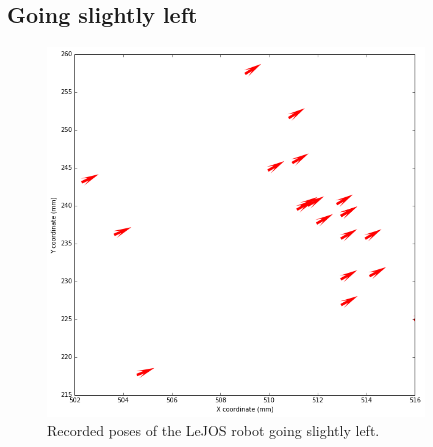 \documentclass[paper=a4, fontsize=11pt]{scrartcl} %
\begin{document}
    \subsection{Going slightly left}
    \begin{figure}[h]
        \begin{center}
            \setlength{\fboxsep}{0.5pt} %
            \setlength{\fboxrule}{0.5pt}
            \includegraphics[width=10cm,fbox]{images/poses_plot_2_slightLeft.png}
            \caption{Recorded poses of the LeJOS robot going slightly left.}
        \end{center}
    \end{figure}
\end{document}
